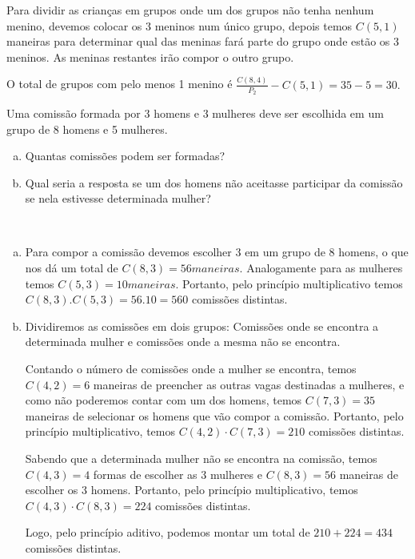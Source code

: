 \documentclass[a4paper, 12pt, addpoints]{exam}
\begin{document}
\begin{questions}
\begin{resp}
Para dividir as crianças em grupos onde um dos grupos não tenha nenhum menino, devemos colocar os 3 meninos num único grupo, depois temos $C(5,1)$ maneiras para determinar qual das meninas fará parte do grupo onde estão os 3 meninos. As meninas restantes irão compor o outro grupo.

O total de grupos com pelo menos 1 menino é $\frac{C(8,4)}{P_2} - C(5,1) = 35 - 5 = 30.$


\end{resp}

\question Uma comissão formada por 3 homens e 3 mulheres deve ser escolhida
em um grupo de 8 homens e 5 mulheres.

\begin{enumerate}[a)]
    \item Quantas comissões podem ser formadas?
    \item Qual seria a resposta se um dos homens não aceitasse participar da comissão se nela estivesse determinada mulher?
\end{enumerate}

\begin{resp}~

  \begin{enumerate}[a)]
    \item Para compor a comissão devemos escolher 3 em um grupo de 8 homens, o que nos dá um total de $C(8,3) = 56 maneiras$. Analogamente para as mulheres temos $C(5,3) = 10 maneiras$. Portanto, pelo princípio multiplicativo temos $C(8,3) . C(5,3) = 56 . 10 = 560$ comissões distintas.
    \item Dividiremos as comissões em dois grupos: Comissões onde se encontra a determinada mulher e comissões onde a mesma não se encontra.

    Contando o número de comissões onde a mulher se encontra, temos $C(4,2) = 6$ maneiras de preencher as outras vagas destinadas a mulheres, e como não poderemos contar com um dos homens, temos $C(7,3) = 35$ maneiras de selecionar os homens que vão compor a comissão. Portanto, pelo princípio multiplicativo, temos $C(4,2) \cdot C(7,3) = 210$ comissões distintas.
    
    Sabendo que a determinada mulher não se encontra na comissão, temos $C(4,3) = 4$ formas de escolher as 3 mulheres e $C(8,3) = 56$ maneiras de escolher os 3 homens. Portanto, pelo princípio multiplicativo, temos $C(4,3) \cdot C(8,3) = 224$ comissões distintas.
    
    Logo, pelo princípio aditivo, podemos montar um total de $210 + 224 = 434$ comissões distintas.
    

\end{enumerate}
\end{resp}
\end{questions}
\end{document}
